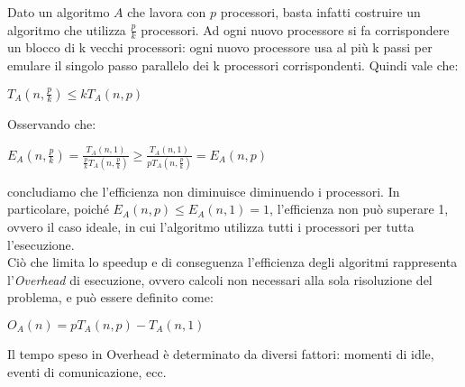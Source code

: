 Dato un algoritmo $A$ che lavora con $p$ processori, basta infatti costruire un algoritmo che utilizza $\frac{p}{k}$ processori. Ad ogni nuovo processore si fa corrispondere un blocco di k vecchi processori: ogni nuovo processore usa al più k passi per emulare il singolo passo parallelo dei k processori corrispondenti. Quindi vale che:
\begin{center}
$\displaystyle T_{A}(n,\frac{p}{k}) \leq k T_{A}(n,p)$
\end{center}
Osservando che:
\begin{center}
$\displaystyle E_{A}(n, \frac{p}{k}) = \frac{T_{A}(n,1)}{\frac{p}{k} T_{A}(n, \frac{p}{k})} \geq \frac{T_{A}(n,1)}{p T_{A}(n, \frac{p}{k})} = E_{A}(n,p)$
\end{center}
concludiamo che l'efficienza non diminuisce diminuendo i processori. In particolare, poiché $E_{A}(n,p) \leq E_{A}(n,1) = 1$, l'efficienza non può superare 1, ovvero il caso ideale, in cui l'algoritmo utilizza tutti i processori per tutta l'esecuzione.\\
Ciò che limita lo speedup e di conseguenza l'efficienza degli algoritmi rappresenta l'\textit{Overhead} di esecuzione, ovvero calcoli non necessari alla sola risoluzione del problema, e può essere definito come:
\begin{center}
$O_{A}(n) = p T_{A}(n,p) - T_{A}(n,1)$
\end{center}
Il tempo speso in Overhead è determinato da diversi fattori: momenti di idle, eventi di comunicazione, ecc.
\newpage
